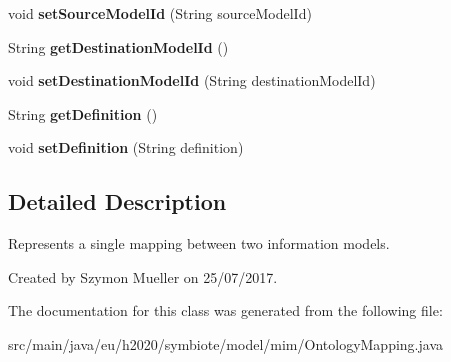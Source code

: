 \begin{DoxyCompactItemize}
void {\bfseries set\+Source\+Model\+Id} (String source\+Model\+Id)
\item 
\mbox{\label{classeu_1_1h2020_1_1symbiote_1_1model_1_1mim_1_1OntologyMapping_a94d9c03f4b4b3f0ece1f89a7a9673473}} 
String {\bfseries get\+Destination\+Model\+Id} ()
\item 
\mbox{\label{classeu_1_1h2020_1_1symbiote_1_1model_1_1mim_1_1OntologyMapping_ae6ca58c760a571c485cb766be9677af2}} 
void {\bfseries set\+Destination\+Model\+Id} (String destination\+Model\+Id)
\item 
\mbox{\label{classeu_1_1h2020_1_1symbiote_1_1model_1_1mim_1_1OntologyMapping_a769ea505db6547c48aa2d31feaaa7e56}} 
String {\bfseries get\+Definition} ()
\item 
\mbox{\label{classeu_1_1h2020_1_1symbiote_1_1model_1_1mim_1_1OntologyMapping_af45e9b8a20fe4c9de05b3948503ef641}} 
void {\bfseries set\+Definition} (String definition)
\end{DoxyCompactItemize}


\subsection{Detailed Description}
Represents a single mapping between two information models.

Created by Szymon Mueller on 25/07/2017. 

The documentation for this class was generated from the following file\+:\begin{DoxyCompactItemize}
\item 
src/main/java/eu/h2020/symbiote/model/mim/Ontology\+Mapping.\+java\end{DoxyCompactItemize}
